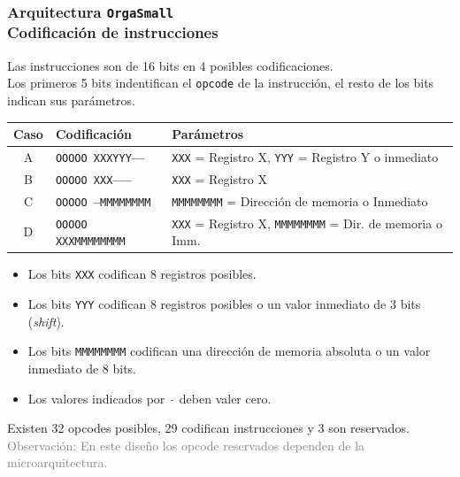 \documentclass[aspectratio=169]{beamer}
\begin{document}
\begin{frame}[fragile,t]
    \frametitle{Arquitectura \texttt{OrgaSmall}\\ \small Codificación de instrucciones}
    \small
    Las instrucciones son de 16 bits en 4 posibles codificaciones.\\
    \textcolor{verdeuca}{Los primeros 5 bits indentifican el \texttt{opcode} de la instrucción, el resto de los bits indican sus parámetros.}
    \pause
    \begin{center}
    \begin{tabular}{c|l|l}
    Caso & Codificación               & Parámetros \\
    \hline
    A    & \texttt{\textcolor{r}{OOOOO} \textcolor{v}{XXX}\textcolor{verde}{YYY}\textcolor{gray}{-----}} & \texttt{\textcolor{v}{XXX}} = Registro X, \texttt{\textcolor{verde}{YYY}} = Registro Y o inmediato \\
    B    & \texttt{\textcolor{r}{OOOOO} \textcolor{v}{XXX}\textcolor{gray}{--------}} & \texttt{\textcolor{v}{XXX}} = Registro X\\
    C    & \texttt{\textcolor{r}{OOOOO} \textcolor{gray}{---}\textcolor{a}{MMMMMMMM}} & \texttt{\textcolor{a}{MMMMMMMM}} = Dirección de memoria o Inmediato\\
    D    & \texttt{\textcolor{r}{OOOOO} \textcolor{v}{XXX}\textcolor{a}{MMMMMMMM}}    & \texttt{\textcolor{v}{XXX}} = Registro X, \texttt{\textcolor{a}{MMMMMMMM}} = Dir. de memoria o Imm.\\
    \end{tabular}
    \end{center}
    \small
    \begin{itemize}
    \setlength\itemsep{0em}
    \item Los bits \texttt{\textcolor{v}{XXX}} codifican 8 registros posibles.
    \item Los bits \texttt{\textcolor{verde}{YYY}} codifican 8 registros posibles o un valor inmediato de 3 bits (\emph{shift}).
    \item Los bits \texttt{\textcolor{a}{MMMMMMMM}} codifican una dirección de memoria absoluta o un valor inmediato de 8 bits.
    \item Los valores indicados por \texttt{\textcolor{gray}{-}} deben valer cero.
    \end{itemize}
    Existen 32 opcodes posibles, 29 codifican instrucciones y 3 son reservados.\\
    \textcolor{gray}{Observación: En este diseño los opcode reservados dependen de la microarquitectura.}
    \normalsize
\end{frame}
\end{document}
